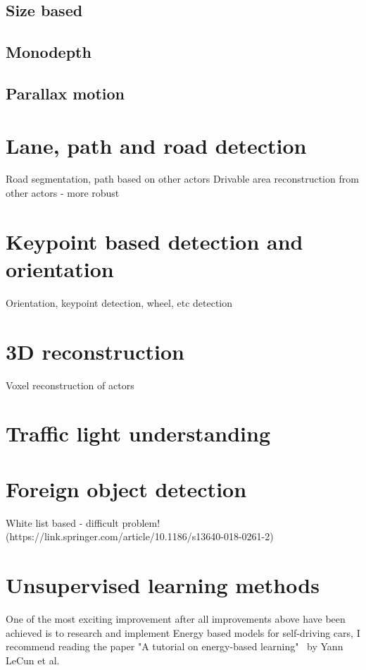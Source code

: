 \subsection{Size based}
\subsection{Monodepth}
\subsection{Parallax motion}
\section{Lane, path and road detection}
Road segmentation, path  based on other actors
Drivable area reconstruction from other actors - more robust

\section{Keypoint based detection and orientation}
Orientation, keypoint detection, wheel, etc detection
\section{3D reconstruction}
Voxel reconstruction of actors
\section{Traffic light understanding}
\section{Foreign object detection}
White list based - difficult problem! (https://link.springer.com/article/10.1186/s13640-018-0261-2)

\section{Unsupervised learning methods}
One of the most exciting improvement after all improvements above have been
achieved is to research and implement Energy based models for self-driving cars,
I recommend reading the paper "A tutorial on energy-based
learning"~\cite{Lecun98gradient-basedlearning} by Yann LeCun et al.